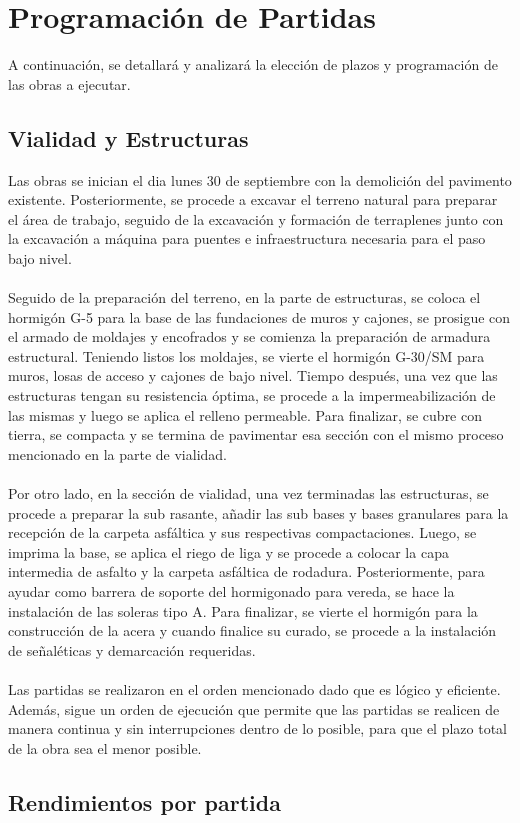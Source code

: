 \section{Programación de Partidas}

A continuación, se detallará y analizará la elección de plazos y programación de las obras a ejecutar.

\subsection{Vialidad y Estructuras}

Las obras se inician el dia lunes 30 de septiembre con la demolición del
pavimento existente. Posteriormente, se procede a excavar el terreno natural
para preparar el área de trabajo, seguido de la excavación y formación de
terraplenes junto con la excavación a máquina para puentes e infraestructura
necesaria para el paso bajo nivel. 
\\\\
Seguido de la preparación del terreno, en la parte de estructuras, se coloca el hormigón G-5 
para la base de las fundaciones de muros y cajones, se prosigue con el armado de moldajes y 
encofrados y se comienza la preparación de armadura estructural. Teniendo listos los moldajes, 
se vierte el hormigón G-30/SM para muros, losas de acceso y cajones de bajo nivel. Tiempo después, 
una vez que las estructuras tengan su resistencia óptima, se procede a la impermeabilización de las 
mismas y luego se aplica el relleno permeable. Para finalizar, se cubre con tierra, se compacta 
y se termina de pavimentar esa sección con el mismo proceso mencionado en la parte de vialidad.
\\\\
Por otro lado, en la sección de vialidad, una vez terminadas las estructuras, se procede
a preparar la sub rasante, añadir las sub bases y bases granulares para la recepción de 
la carpeta asfáltica y sus respectivas compactaciones. Luego, se imprima la base, se
aplica el riego de liga y se procede a colocar la capa intermedia de asfalto y 
la carpeta asfáltica de rodadura. Posteriormente, para ayudar como barrera de soporte del 
hormigonado para vereda, se hace la instalación de las soleras tipo A. Para finalizar, se vierte el
hormigón para la construcción de la acera y cuando finalice su curado, se procede a la 
instalación de señaléticas y demarcación requeridas.
\\\\
Las partidas se realizaron en el orden mencionado dado que es lógico y eficiente. Además, sigue un
orden de ejecución que permite que las partidas se realicen de manera continua y sin interrupciones
dentro de lo posible, para que el plazo total de la obra sea el menor posible.

\subsection{Rendimientos por partida}
